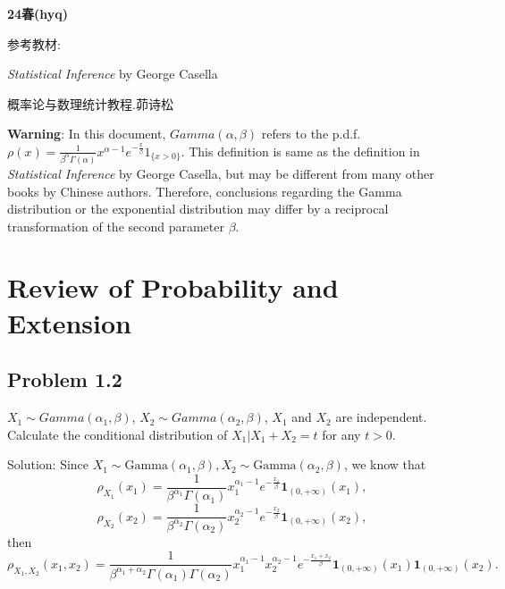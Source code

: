 \newcommand{\Var}{\operatorname{Var}}
\newcommand{\Cov}{\operatorname{Cov}}
\newcommand{\Bin}{\operatorname{Binomial}}
\newcommand{\Poi}{\operatorname{Poisson}}

\newcommand{\Ex}{\mathbb{E}}
\newcommand{\indep}{\perp\!\!\!\perp}
\newcommand{\1}{\mathbf{1}}


\renewcommand\thesection{Chapter \arabic{section}}

\textbf{24春(hyq)}

参考教材:

\textit{Statistical Inference} by George Casella

概率论与数理统计教程.茆诗松

\textbf{Warning}: In this document, $Gamma(\alpha,\beta)$ refers to the p.d.f. $\rho(x)=\frac{1}{\beta^\alpha\Gamma(\alpha)}x^{\alpha-1}e^{-\frac{x}{\beta}}1_{\{x>0\}}$. This definition is same as the definition in \textit{Statistical Inference} by George Casella, but may be different from many other books by Chinese authors. Therefore, conclusions regarding the Gamma distribution or the exponential distribution may differ by a reciprocal transformation of the second parameter $\beta$.

\section{Review of Probability and Extension}

\subsection*{Problem 1.2}
$X_{1}\sim Gamma(\alpha_{1},\beta)$, $X_{2}\sim Gamma(\alpha_{2},\beta)$, $X_{1}$ and $X_{2}$ are independent. Calculate the conditional distribution of $X_{1}|X_{1}+X_{2}=t$ for any $t>0$.

{Solution:}
Since $X_{1}\sim\text{Gamma}\left(\alpha_{1},\beta\right),X_{2}\sim\text{Gamma}\left(\alpha_{2},\beta\right)$, we know that
\[
\rho_{X_{1}}\left(x_{1}\right)=\frac{1}{\beta^{\alpha_{1}}\Gamma\left(\alpha_{1}\right)}x_{1}^{\alpha_{1}-1}e^{-\frac{x_{1}}{\beta}}\1_{\left(0,+\infty\right)}\left(x_{1}\right),
\]
\[
\rho_{X_{2}}\left(x_{2}\right)=\frac{1}{\beta^{\alpha_{2}}\Gamma\left(\alpha_{2}\right)}x_{2}^{\alpha_{2}-1}e^{-\frac{x_{2}}{\beta}}\1_{\left(0,+\infty\right)}\left(x_{2}\right),
\]
then
\[
\rho_{X_{1},X_{2}}\left(x_{1},x_{2}\right)=\frac{1}{\beta^{\alpha_{1}+\alpha_{2}}\Gamma\left(\alpha_{1}\right)\Gamma\left(\alpha_{2}\right)}x_{1}^{\alpha_{1}-1}x_{2}^{\alpha_{2}-1}e^{-\frac{x_{1}+x_{2}}{\beta}}\1_{\left(0,+\infty\right)}\left(x_{1}\right)\1_{\left(0,+\infty\right)}\left(x_{2}\right).
\]

